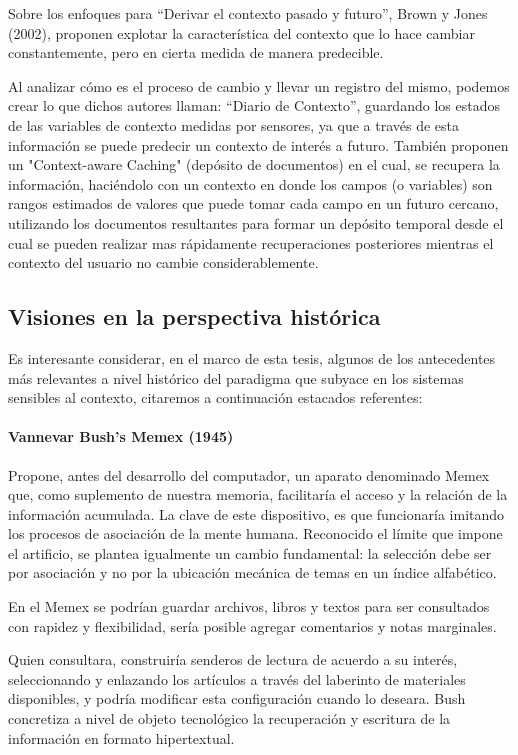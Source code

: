 Sobre los enfoques para “Derivar el contexto pasado y futuro”, Brown y Jones (2002), proponen explotar la característica del contexto que lo hace cambiar constantemente, pero en cierta medida de manera predecible.

Al analizar cómo es el proceso de cambio y llevar un registro del mismo, podemos crear lo que dichos autores llaman: “Diario de Contexto”, guardando los estados de las variables de contexto medidas por sensores, ya que a través de esta información se puede predecir un contexto de interés a futuro. También proponen un "Context-aware Caching" (depósito de documentos) en el cual, se recupera la información, haciéndolo con un contexto en donde los campos (o variables) son rangos estimados de valores que puede tomar cada campo en un futuro cercano, utilizando los documentos resultantes para formar un depósito temporal desde el cual se pueden realizar mas rápidamente recuperaciones posteriores mientras el contexto del usuario no cambie considerablemente.

\subsection {Visiones en la perspectiva histórica}
 
Es interesante considerar, en el marco de esta tesis, algunos de los antecedentes más relevantes a nivel histórico del paradigma que subyace en los sistemas sensibles al contexto, citaremos a continuación estacados referentes:

\paragraph {Vannevar Bush's Memex (1945)}

Propone, antes del desarrollo del computador, un aparato denominado Memex que, como suplemento de nuestra memoria, facilitaría el acceso y la relación de la información acumulada. La clave de este dispositivo, es que funcionaría imitando los procesos de asociación de la mente humana. Reconocido el límite que impone el artificio, se plantea igualmente un cambio fundamental: la selección debe ser por asociación y no por la ubicación mecánica de temas en un índice alfabético.

En el Memex se podrían guardar archivos, libros y textos para ser consultados con rapidez y flexibilidad, sería posible agregar comentarios y notas marginales.

Quien consultara, construiría senderos de lectura de acuerdo a su interés, seleccionando y enlazando los artículos a través del laberinto de materiales disponibles, y podría modificar esta configuración cuando lo deseara. Bush concretiza a nivel de objeto tecnológico la recuperación y escritura de la información en formato hipertextual.

